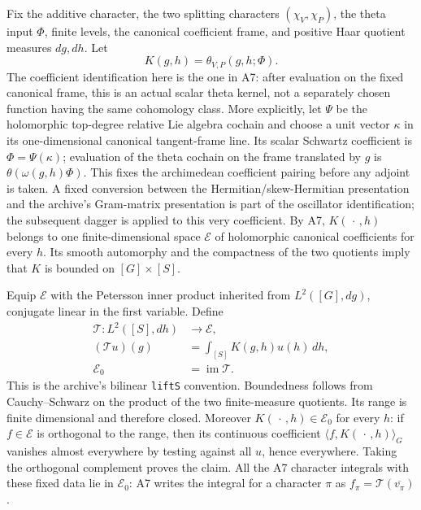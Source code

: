 Fix the additive character, the two splitting characters
$(\chi_V,\chi_P)$, the theta input $\Phi$, finite levels, the
canonical coefficient frame, and positive Haar quotient measures
$dg,dh$. Let
\[
 K(g,h)=\theta_{V,P}(g,h;\Phi).
\]
The coefficient identification here is the one in A7: after
evaluation on the fixed canonical frame, this is an actual scalar
theta kernel, not a separately chosen function having the same
cohomology class. More explicitly, let $\Psi$ be the holomorphic
top-degree relative Lie algebra cochain and choose a unit vector
$\kappa$ in its one-dimensional canonical tangent-frame line.
Its scalar Schwartz coefficient is $\Phi=\Psi(\kappa)$; evaluation
of the theta cochain on the frame translated by $g$ is
$\theta(\omega(g,h)\Phi)$. This fixes the archimedean coefficient
pairing before any adjoint is taken. A fixed conversion between
the Hermitian/skew-Hermitian presentation and the archive's
Gram-matrix presentation is part of the oscillator identification;
the subsequent dagger is applied to this very coefficient.
By A7, $K(\,\cdot\,,h)$ belongs to one
finite-dimensional space $\mathcal E$ of holomorphic canonical
coefficients for every $h$. Its smooth automorphy and the
compactness of the two quotients imply that $K$ is bounded on
$[G]\times[S]$.

Equip $\mathcal E$ with the Petersson inner product inherited from
$L^2([G],dg)$, conjugate linear in the first variable. Define
\begin{equation}
\begin{aligned}
 \mathcal T:L^2([S],dh)&\longrightarrow\mathcal E,\\
 (\mathcal T u)(g)&=\int_{[S]}K(g,h)u(h)\,dh,\\
 \mathcal E_0&=\operatorname{im}\mathcal T.
\end{aligned}
\tag{B17a}
\end{equation}
This is the archive's bilinear \texttt{liftS} convention. Boundedness
follows from Cauchy--Schwarz on the product of the two finite-measure
quotients. Its range is finite dimensional and therefore closed.
Moreover $K(\,\cdot\,,h)\in\mathcal E_0$ for every $h$:
if $f\in\mathcal E$ is orthogonal to the range, then its
continuous coefficient $\langle f,K(\,\cdot\,,h)\rangle_G$
vanishes almost everywhere by testing against all $u$, hence
everywhere. Taking the orthogonal complement proves the claim.
All the A7 character integrals with these fixed data lie in
$\mathcal E_0$: A7 writes the integral for a character $\pi$ as
$f_\pi=\mathcal T(\overline{v_\pi})$.

